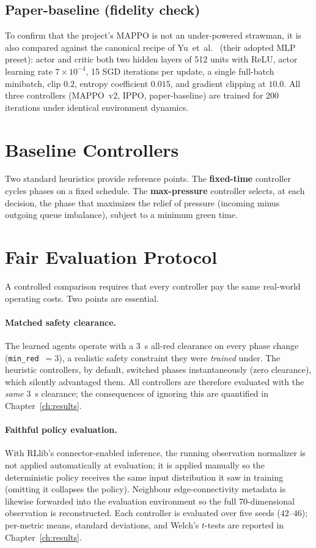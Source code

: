 \subsection{Paper-baseline (fidelity check)}
To confirm that the project's MAPPO is not an under-powered strawman, it is also
compared against the canonical recipe of Yu~et~al.~\cite{yu2021mappo} (their adopted
MLP preset): actor and critic both two hidden layers of 512 units with ReLU, actor
learning rate $7\times10^{-4}$, 15 SGD iterations per update, a single full-batch
minibatch, clip $0.2$, entropy coefficient $0.015$, and gradient clipping at
$10.0$. All three controllers (MAPPO~v2, IPPO, paper-baseline) are trained for 200
iterations under identical environment dynamics.

\section{Baseline Controllers}
Two standard heuristics provide reference points. The \textbf{fixed-time}
controller cycles phases on a fixed schedule. The \textbf{max-pressure} controller
selects, at each decision, the phase that maximizes the relief of pressure
(incoming minus outgoing queue imbalance), subject to a minimum green time.

\section{Fair Evaluation Protocol}
\label{sec:fairproto}
A controlled comparison requires that every controller pay the same real-world
operating costs. Two points are essential.

\paragraph{Matched safety clearance.} The learned agents operate with a
\SI{3}{\second} all-red clearance on every phase change (\texttt{min\_red}~$=3$), a
realistic safety constraint they were \emph{trained} under. The heuristic
controllers, by default, switched phases instantaneously (zero clearance), which
silently advantaged them. All controllers are therefore evaluated with the
\emph{same} \SI{3}{\second} clearance; the consequences of ignoring this are
quantified in Chapter~\ref{ch:results}.

\paragraph{Faithful policy evaluation.} With RLlib's connector-enabled inference,
the running observation normalizer is not applied automatically at evaluation; it is
applied manually so the deterministic policy receives the same input distribution it
saw in training (omitting it collapses the policy). Neighbour edge-connectivity
metadata is likewise forwarded into the evaluation environment so the full
70-dimensional observation is reconstructed. Each controller is evaluated over five
seeds ($42$--$46$); per-metric means, standard deviations, and Welch's $t$-tests are
reported in Chapter~\ref{ch:results}.
